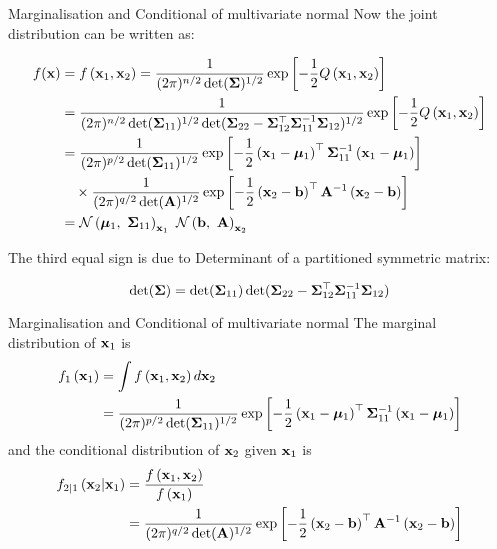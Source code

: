 \documentclass{beamer}
\begin{document}
\begin{frame}{Marginalisation and Conditional of multivariate normal}
	\small
    Now the joint distribution can be written as: 
	
	$$
	\begin{aligned}
		f(\vx) &=f\left(\vx_{1}, \vx_{2}\right)=\frac{1}{(2 \pi)^{n / 2}\det(\mSigma)^{1 / 2}} \exp \left[-\frac{1}{2} Q\left(\vx_{1}, \vx_{2}\right)\right] \\ 
		&=\frac{1}{(2 \pi)^{n / 2}\det(\mSigma_{11})^{1 / 2}\det(\mSigma_{22}-\mSigma_{12}\tp \mSigma_{11}\inv \mSigma_{12})^{1 / 2}} \exp \left[-\frac{1}{2} Q\left(\vx_{1}, \vx_{2}\right)\right] \\ 
		&=\frac{1}{(2 \pi)^{p / 2}\det(\mSigma_{11})^{1 / 2}} \exp \left[-\frac{1}{2}\left(\vx_{1}-\vmu_{1}\right)\tp \mSigma_{11}\inv\left(\vx_{1}-\vmu_{1}\right)\right] \\
		&\quad \times \frac{1}{(2 \pi)^{q / 2}\det(\mA)^{1 / 2}} \exp \left[-\frac{1}{2}\left(\vx_{2}-\vb\right)\tp \mA\inv\left(\vx_{2}-\vb\right)\right] \\ 
		&=\distribReal{N}{\vmu_1}{\mSigma_{11}}_{\vx_1}\ \distribReal{N}{\vb}{\mA}_{\vx_2}
	\end{aligned}
	$$
	
	The third equal sign is due to Determinant of a partitioned symmetric matrix:

	$$
	\operatorname{det}(\boldsymbol{\Sigma})=\operatorname{det}(\boldsymbol{\Sigma}_{11})\operatorname{det}(\boldsymbol{\Sigma}_{22}-\boldsymbol{\Sigma}_{12}^\top \boldsymbol{\Sigma}_{11}^{-1} \boldsymbol{\Sigma}_{12})
	$$
\end{frame}

\begin{frame}{Marginalisation and Conditional of multivariate normal}
	The marginal distribution of $\mathbf{x}_1$ is 
	\begin{align*}
    f_{1}\left(\mathbf{x}_{1}\right)&=\int f\left(\mathbf{x}_{1}, \mathbf{x}_{2}\right) d \mathbf{x}_{2} \\
    &=\frac{1}{(2 \pi)^{p / 2}\operatorname{det}(\boldsymbol{\Sigma}_{11})^{1 / 2}} \exp \left[-\frac{1}{2}\left(\mathbf{x}_{1}-\boldsymbol{\mu}_{1}\right)^\top \boldsymbol{\Sigma}_{11}^{-1}\left(\mathbf{x}_{1}-\boldsymbol{\mu}_{1}\right)\right]
	\end{align*}
	and the conditional distribution of $\mathbf{x}_2$ given $\mathbf{x}_1$ is 
	\begin{align*}
	f_{2 | 1}\left(\mathbf{x}_{2} | \mathbf{x}_{1}\right)&=\frac{f\left(\mathbf{x}_{1}, \mathbf{x}_{2}\right)}{f\left(\mathbf{x}_{1}\right)} \\
	&=\frac{1}{(2 \pi)^{q / 2}\operatorname{det}(\mathbf{A})^{1 / 2}} \exp \left[-\frac{1}{2}\left(\mathbf{x}_{2}-\mathbf{b}\right)^\top \mathbf{A}^{-1}\left(\mathbf{x}_{2}-\mathbf{b}\right)\right]
	\end{align*}
\end{frame}
\end{document}
